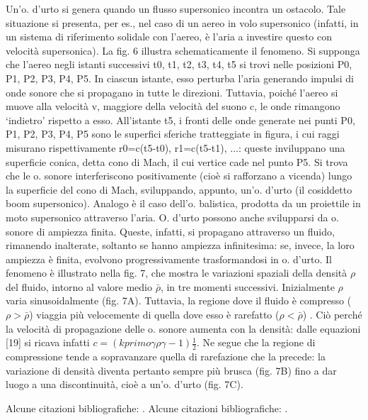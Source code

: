 \documentclass[a4paper]{article}
\begin{document}
Un’o. d’urto si genera quando un flusso supersonico incontra un ostacolo. Tale situazione si presenta, per es., nel caso di un aereo in volo supersonico (infatti, in un sistema di riferimento solidale con l’aereo, è l’aria a investire questo con velocità supersonica). La fig. 6 illustra schematicamente il fenomeno. Si supponga che l’aereo negli istanti successivi t0, t1, t2, t3, t4, t5 si trovi nelle posizioni P0, P1, P2, P3, P4, P5. In ciascun istante, esso perturba l’aria generando impulsi di onde sonore che si propagano in tutte le direzioni. Tuttavia, poiché l’aereo si muove alla velocità v, maggiore della velocità del suono c, le onde rimangono ‘indietro’ rispetto a esso. All’istante t5, i fronti delle onde generate nei punti P0, P1, P2, P3, P4, P5 sono le superfici sferiche tratteggiate in figura, i cui raggi misurano rispettivamente r0=c(t5-t0), r1=c(t5-t1), ...: queste inviluppano una superficie conica, detta cono di Mach, il cui vertice cade nel punto P5. Si trova che le o. sonore interferiscono positivamente (cioè si rafforzano a vicenda) lungo la superficie del cono di Mach, sviluppando, appunto, un’o. d’urto (il cosiddetto boom supersonico). 
Analogo è il caso dell’o. balistica, prodotta da un proiettile in moto supersonico attraverso l’aria. O. d’urto possono anche svilupparsi da o. sonore di ampiezza finita. 
Queste, infatti, si propagano attraverso un fluido, rimanendo inalterate, soltanto se hanno ampiezza infinitesima: se, invece, la loro ampiezza è finita, evolvono progressivamente trasformandosi in o. d’urto. Il fenomeno è illustrato nella fig. 7, che mostra le variazioni spaziali della densità $\rho$ del fluido, intorno al valore medio $\bar{\rho}$, in tre momenti successivi. 
Inizialmente $\rho$ varia sinusoidalmente (fig. 7A). Tuttavia, la regione dove il fluido è compresso ($\rho>\bar{\rho}$) viaggia più velocemente di quella dove esso è rarefatto ($\rho<\bar{\rho}$) . 
Ciò perché la velocità di propagazione delle o. sonore aumenta con la densità: dalle equazioni [19] si ricava infatti 
$c=(k primo \gamma\rho \gamma-1)\frac{1}{2}$. 
Ne segue che la regione di compressione tende a sopravanzare quella di rarefazione che la precede: la variazione di densità diventa pertanto sempre più brusca (fig. 7B) fino a dar luogo a una discontinuità, cioè a un’o. d’urto (fig. 7C). 



Alcune citazioni bibliografiche:  \citet{bosellini_scienze_2013,hess_mcknights_2013,walker_halliday_2018,telford_applied_1990}.
Alcune citazioni bibliografiche:  \citet{bosellini_scienze_2013,baggio_note_1969}.
\citep{turcotte_geodynamics_2014,turcotte_geodynamics_2002}


\begin{small}
 
\end{small}
\end{document}
